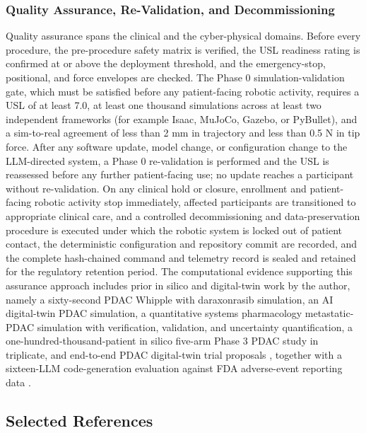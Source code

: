 \subsubsection{Quality Assurance, Re-Validation, and Decommissioning}

Quality assurance spans the clinical and the cyber-physical domains. Before every
procedure, the pre-procedure safety matrix is verified, the USL readiness rating is
confirmed at or above the deployment threshold, and the emergency-stop, positional,
and force envelopes are checked. The Phase 0 simulation-validation gate, which must
be satisfied before any patient-facing robotic activity, requires a USL of at least
7.0, at least one thousand simulations across at least two independent frameworks
(for example Isaac, MuJoCo, Gazebo, or PyBullet), and a sim-to-real agreement of
less than 2 mm in trajectory and less than 0.5 N in tip force. After any software
update, model change, or configuration change to the LLM-directed system, a Phase 0
re-validation is performed and the USL is reassessed before any further
patient-facing use; no update reaches a participant without re-validation. On any
clinical hold or closure, enrollment and patient-facing robotic activity stop
immediately, affected participants are transitioned to appropriate clinical care,
and a controlled decommissioning and data-preservation procedure is executed under
which the robotic system is locked out of patient contact, the deterministic
configuration and repository commit are recorded, and the complete hash-chained
command and telemetry record is sealed and retained for the regulatory retention
period. The computational evidence supporting this assurance approach includes
prior in silico and digital-twin work by the author, namely a sixty-second PDAC
Whipple with daraxonrasib simulation, an AI digital-twin PDAC simulation, a
quantitative systems pharmacology metastatic-PDAC simulation with verification,
validation, and uncertainty quantification, a one-hundred-thousand-patient in silico
five-arm Phase 3 PDAC study in triplicate, and end-to-end PDAC digital-twin trial
proposals \cite{qspmetpancre,fdadigtwinpc,chatgpt100kp,pdacdigtwinp}, together with a
sixteen-LLM code-generation evaluation against FDA adverse-event reporting data
\cite{llmcomp16fda}.

\subsection{Selected References}

